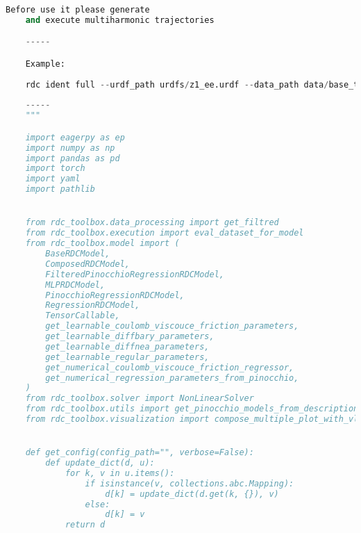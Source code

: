 \begin{lstlisting}[language=python, caption=\raggedright{identification/full.py}, frame=single]
    Before use it please generate
    and execute multiharmonic trajectories

    -----

    Example:
    
    rdc ident full --urdf_path urdfs/z1_ee.urdf --data_path data/base_trj/opttraj_0_85cond_7h_2000Hz/ --config_path configs/learning_config.yaml --verbose  --plot --model_name my --save_path my --accel_mode estimate
    
    -----
    """

    import eagerpy as ep
    import numpy as np
    import pandas as pd
    import torch
    import yaml
    import pathlib


    from rdc_toolbox.data_processing import get_filtred
    from rdc_toolbox.execution import eval_dataset_for_model
    from rdc_toolbox.model import (
        BaseRDCModel,
        ComposedRDCModel,
        FilteredPinocchioRegressionRDCModel,
        MLPRDCModel,
        PinocchioRegressionRDCModel,
        RegressionRDCModel,
        TensorCallable,
        get_learnable_coulomb_viscouce_friction_parameters,
        get_learnable_diffbary_parameters,
        get_learnable_diffnea_parameters,
        get_learnable_regular_parameters,
        get_numerical_coulomb_viscouce_friction_regressor,
        get_numerical_regression_parameters_from_pinocchio,
    )
    from rdc_toolbox.solver import NonLinearSolver
    from rdc_toolbox.utils import get_pinocchio_models_from_description
    from rdc_toolbox.visualization import compose_multiple_plot_with_vline


    def get_config(config_path="", verbose=False):
        def update_dict(d, u):
            for k, v in u.items():
                if isinstance(v, collections.abc.Mapping):
                    d[k] = update_dict(d.get(k, {}), v)
                else:
                    d[k] = v
            return d


\end{lstlisting}
